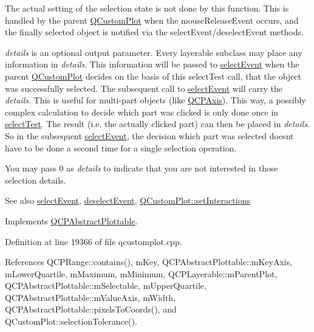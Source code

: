 The actual setting of the selection state is not done by this function. This is handled by the parent \hyperlink{class_q_custom_plot}{Q\+Custom\+Plot} when the mouse\+Release\+Event occurs, and the finally selected object is notified via the select\+Event/deselect\+Event methods.

{\itshape details} is an optional output parameter. Every layerable subclass may place any information in {\itshape details}. This information will be passed to \hyperlink{class_q_c_p_abstract_plottable_a16aaad02456aa23a759efd1ac90c79bf}{select\+Event} when the parent \hyperlink{class_q_custom_plot}{Q\+Custom\+Plot} decides on the basis of this select\+Test call, that the object was successfully selected. The subsequent call to \hyperlink{class_q_c_p_abstract_plottable_a16aaad02456aa23a759efd1ac90c79bf}{select\+Event} will carry the {\itshape details}. This is useful for multi-\/part objects (like \hyperlink{class_q_c_p_axis}{Q\+C\+P\+Axis}). This way, a possibly complex calculation to decide which part was clicked is only done once in \hyperlink{class_q_c_p_statistical_box_a7d3ac843dc48a085740fdfc4319a89cc}{select\+Test}. The result (i.\+e. the actually clicked part) can then be placed in {\itshape details}. So in the subsequent \hyperlink{class_q_c_p_abstract_plottable_a16aaad02456aa23a759efd1ac90c79bf}{select\+Event}, the decision which part was selected doesn\textquotesingle{}t have to be done a second time for a single selection operation.

You may pass 0 as {\itshape details} to indicate that you are not interested in those selection details.

\begin{DoxySeeAlso}{See also}
\hyperlink{class_q_c_p_abstract_plottable_a16aaad02456aa23a759efd1ac90c79bf}{select\+Event}, \hyperlink{class_q_c_p_abstract_plottable_a6fa0d0f95560ea8b01ee13f296dab2b1}{deselect\+Event}, \hyperlink{class_q_custom_plot_a5ee1e2f6ae27419deca53e75907c27e5}{Q\+Custom\+Plot\+::set\+Interactions} 
\end{DoxySeeAlso}


Implements \hyperlink{class_q_c_p_abstract_plottable_a38efe9641d972992a3d44204bc80ec1d}{Q\+C\+P\+Abstract\+Plottable}.



Definition at line 19366 of file qcustomplot.\+cpp.



References Q\+C\+P\+Range\+::contains(), m\+Key, Q\+C\+P\+Abstract\+Plottable\+::m\+Key\+Axis, m\+Lower\+Quartile, m\+Maximum, m\+Minimum, Q\+C\+P\+Layerable\+::m\+Parent\+Plot, Q\+C\+P\+Abstract\+Plottable\+::m\+Selectable, m\+Upper\+Quartile, Q\+C\+P\+Abstract\+Plottable\+::m\+Value\+Axis, m\+Width, Q\+C\+P\+Abstract\+Plottable\+::pixels\+To\+Coords(), and Q\+Custom\+Plot\+::selection\+Tolerance().


